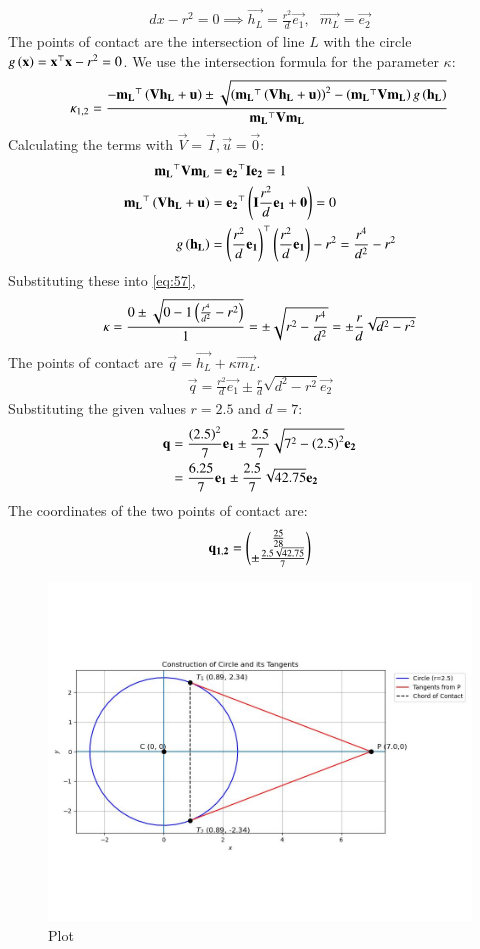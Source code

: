 \documentclass[journal]{IEEEtran}
\begin{document}
\begin{align}
    d x - r^2 = 0 \implies \vec{h_L} = \frac{r^2}{d}\vec{e_1}, \text{ } \vec{m_L} = \vec{e_2}
\end{align}
The points of contact are the intersection of line $L$ with the circle $g\left(\mathbf{x}\right) = \mathbf{x}^\top\mathbf{x}-r^2=0$.
We use the intersection formula for the parameter $\kappa$:
\begin{align}
    \kappa_{1,2} = \frac{-\mathbf{m_L}^\top\left(\mathbf{V}\mathbf{h_L}+\mathbf{u}\right) \pm \sqrt{\left(\mathbf{m_L}^\top\left(\mathbf{V}\mathbf{h_L}+\mathbf{u}\right)\right)^2 - \left(\mathbf{m_L}^\top\mathbf{V}\mathbf{m_L}\right)g\left(\mathbf{h_L}\right)}}{\mathbf{m_L}^\top\mathbf{V}\mathbf{m_L}} \label{eq:57}
\end{align}
Calculating the terms with $\vec{V}=\vec{I}, \vec{u}=\vec{0}$:
\begin{align}
    \mathbf{m_L}^\top\mathbf{V}\mathbf{m_L} &= \mathbf{e_2}^\top\mathbf{I}\mathbf{e_2} = 1 \\
    \mathbf{m_L}^\top\left(\mathbf{V}\mathbf{h_L}+\mathbf{u}\right) &= \mathbf{e_2}^\top\left(\mathbf{I}\frac{r^2}{d}\mathbf{e_1}+\mathbf{0}\right) = 0 \\
    g\left(\mathbf{h_L}\right) &= \left(\frac{r^2}{d}\mathbf{e_1}\right)^\top\left(\frac{r^2}{d}\mathbf{e_1}\right) - r^2 = \frac{r^4}{d^2} - r^2
\end{align}
Substituting these into \eqref{eq:57},
\begin{align}
    \kappa = \frac{0 \pm \sqrt{0 - 1\left(\frac{r^4}{d^2}-r^2\right)}}{1} = \pm\sqrt{r^2 - \frac{r^4}{d^2}} = \pm \frac{r}{d}\sqrt{d^2-r^2}
\end{align}
The points of contact are $\vec{q} = \vec{h_L} + \kappa\vec{m_L}$.
\begin{align}
    \vec{q} = \frac{r^2}{d}\vec{e_1} \pm \frac{r}{d}\sqrt{d^2-r^2}\vec{e_2}
\end{align}
Substituting the given values $r=2.5$ and $d=7$:
\begin{align}
    \mathbf{q} &= \frac{\left(2.5\right)^2}{7}\mathbf{e_1} \pm \frac{2.5}{7}\sqrt{7^2 - \left(2.5\right)^2}\mathbf{e_2} \\
    &= \frac{6.25}{7}\mathbf{e_1} \pm \frac{2.5}{7}\sqrt{42.75}\mathbf{e_2}
\end{align}
The coordinates of the two points of contact are:
\begin{align}
    \mathbf{q_{1,2}} = \begin{pmatrix}\frac{25}{28} \\ \pm \frac{2.5\sqrt{42.75}}{7}\end{pmatrix}
\end{align}

\begin{figure}[h!]
	\centering
	\includegraphics[width=\columnwidth]{figs/plot_c.jpg}
	\caption*{Plot}
	\label{fig:fig}
\end{figure}
\end{document}
